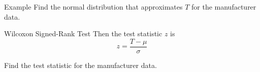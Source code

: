 \begin{frame}{Example}
    Find the normal distribution that approximates $T$ for the manufacturer data. 
\end{frame}

\begin{frame}{Wilcoxon Signed-Rank Test}
    Then the test statistic $z$ is
    \[
        z = \frac{T - \mu}{\sigma}
    \]
    
    \vspace{12pt}Find the test statistic for the manufacturer data. 
\end{frame}
